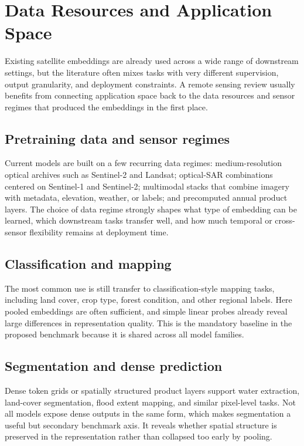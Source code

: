\section{Data Resources and Application Space}

Existing satellite embeddings are already used across a wide range of downstream settings, but the literature often mixes tasks with very different supervision, output granularity, and deployment constraints. A remote sensing review usually benefits from connecting application space back to the data resources and sensor regimes that produced the embeddings in the first place.

\subsection{Pretraining data and sensor regimes}

Current models are built on a few recurring data regimes: medium-resolution optical archives such as Sentinel-2 and Landsat; optical-SAR combinations centered on Sentinel-1 and Sentinel-2; multimodal stacks that combine imagery with metadata, elevation, weather, or labels; and precomputed annual product layers. The choice of data regime strongly shapes what type of embedding can be learned, which downstream tasks transfer well, and how much temporal or cross-sensor flexibility remains at deployment time.

\subsection{Classification and mapping}

The most common use is still transfer to classification-style mapping tasks, including land cover, crop type, forest condition, and other regional labels. Here pooled embeddings are often sufficient, and simple linear probes already reveal large differences in representation quality. This is the mandatory baseline in the proposed benchmark because it is shared across all model families.

\subsection{Segmentation and dense prediction}

Dense token grids or spatially structured product layers support water extraction, land-cover segmentation, flood extent mapping, and similar pixel-level tasks. Not all models expose dense outputs in the same form, which makes segmentation a useful but secondary benchmark axis. It reveals whether spatial structure is preserved in the representation rather than collapsed too early by pooling.

